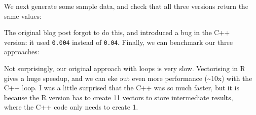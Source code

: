 We next generate some sample data, and check that all three versions
return the same values:

\begin{Shaded}
\begin{Highlighting}[]
\StringTok{ }
\StringTok{ } \NormalTok{, } \NormalTok{)}
\StringTok{ }\NormalTok{(} \NormalTok{)}
\StringTok{ }\NormalTok{(} \NormalTok{(}\NormalTok{, }\NormalTok{), } \NormalTok{)}

\NormalTok{(}
  \NormalTok{(}
  \NormalTok{(}
\NormalTok{)}
\end{Highlighting}
\end{Shaded}

The original blog post forgot to do this, and introduced a bug in the
C++ version: it used \texttt{0.004} instead of \texttt{0.04}. Finally,
we can benchmark our three approaches:

\begin{Shaded}
\begin{Highlighting}[]
\NormalTok{(}
   
   
   
\NormalTok{)}
\end{Highlighting}
\end{Shaded}

Not surprisingly, our original approach with loops is very slow.
Vectorising in R gives a huge speedup, and we can eke out even more
performance (\textasciitilde{}10x) with the C++ loop. I was a little
surprised that the C++ was so much faster, but it is because the R
version has to create 11 vectors to store intermediate results, where
the C++ code only needs to create 1.

